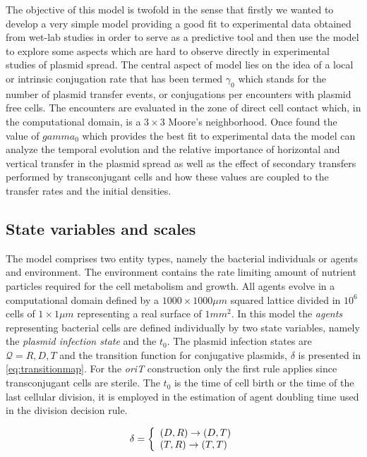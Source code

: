 The objective of this model is twofold in the sense that firstly we wanted to develop a very simple model providing a good fit to experimental data obtained from wet-lab studies in order to serve as a predictive tool and then use the model to explore some aspects which are hard to observe directly in experimental studies of plasmid spread. The central aspect of model lies on the idea of a local or intrinsic conjugation rate that has been termed $\gamma_0$ which stands for the number of plasmid transfer events, or conjugations per encounters with plasmid free cells. The encounters are evaluated in the zone of direct cell contact which, in the computational domain, is a $3 \times 3$ Moore's neighborhood.  Once found the value of $gamma_0$ which provides the best fit to experimental data  the model can analyze the temporal evolution and the relative importance of horizontal and vertical transfer in the plasmid spread as well as the effect of secondary transfers performed by transconjugant cells and how these values are coupled to the transfer rates and the initial densities.


\subsection{State variables and scales}

The model comprises two entity types, namely the bacterial individuals or agents and environment. The environment contains the rate limiting amount of nutrient particles required for the cell metabolism and growth. All agents evolve in a computational domain defined by a $1000\times1000\mu m$ squared lattice divided in $10^6$ cells of $1\times1\mu m$ representing a real surface of $1mm^2$. In this model the {\it agents} representing bacterial cells are defined individually by two state variables, namely the {\it plasmid infection state} and the $t_0$. The plasmid infection states are $\mathcal{Q} = {R,D,T}$  and the transition function for conjugative plasmids, $\delta$ is presented in \eqref{eq:transitionmap}. For the {\it oriT} construction only the first rule applies since transconjugant cells are sterile. The $t_0$ is the time of cell birth or the time of the last cellular division, it is employed in the estimation of agent doubling time used in the division decision rule.

\begin{equation}
\label{eq:transitionmap}
  \delta = \left\{ 
  \begin{array}{l l}
    (D,R) \rightarrow (D,T)	\\
    (T,R) \rightarrow (T,T)	\\
  \end{array} \right.
\end{equation} 

